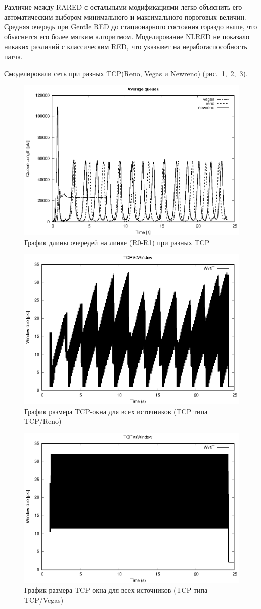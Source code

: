 Различие между RARED с остальными модификациями легко объяснить его
автоматическим выбором минимального и максимального пороговых
величин. Средняя очередь при Gentle RED до стационарного состояния
гораздо выше, что обьяснется его более мягким
алгоритмом. Моделирование NLRED не показало никаких различий с
классическим RED, что указывет на неработаспособность патча.

Смоделировали сеть при разных TCP(Reno, Vegas и Newreno)
(рис.~\ref{fig:3.7},~\ref{fig:3.8},~\ref{fig:3.9}).

\begin{figure}[!h]
  \centering
  \includegraphics[width=0.6\linewidth]{image/av_queues_tcp.eps}
  \caption{График длины очередей на линке (R0-R1) при разных TCP}
  \label{fig:3.7}
\end{figure}

\begin{figure}[!h]
  \centering
  \includegraphics[width=0.6\linewidth]{image/TCP_75-150_classic.eps}
  \caption{График размера TCP-окна для всех источников (TCP типа TCP/Reno)}
  \label{fig:3.8}
\end{figure}

\begin{figure}[!ht]
  \centering
  \includegraphics[width=0.6\linewidth]{image/TCP_vegas.eps}
  \caption{График размера TCP-окна для всех источников (TCP типа TCP/Vegas)}
  \label{fig:3.9}
\end{figure}

